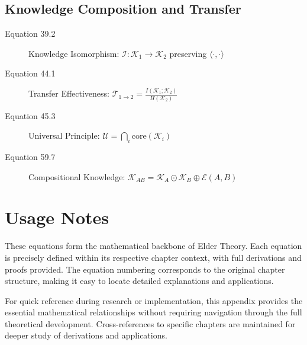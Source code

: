 \subsection{Knowledge Composition and Transfer}

\begin{description}
\item[Equation 39.2] Knowledge Isomorphism: $\mathcal{I}: \mathcal{K}_1 \rightarrow \mathcal{K}_2$ preserving $\langle \cdot, \cdot \rangle$
\item[Equation 44.1] Transfer Effectiveness: $\mathcal{T}_{1 \rightarrow 2} = \frac{I(\mathcal{K}_1; \mathcal{K}_2)}{H(\mathcal{K}_2)}$
\item[Equation 45.3] Universal Principle: $\mathcal{U} = \bigcap_{i} \text{core}(\mathcal{K}_i)$
\item[Equation 59.7] Compositional Knowledge: $\mathcal{K}_{AB} = \mathcal{K}_A \odot \mathcal{K}_B \oplus \mathcal{E}(A,B)$
\end{description}

\section{Usage Notes}

These equations form the mathematical backbone of Elder Theory. Each equation is precisely defined within its respective chapter context, with full derivations and proofs provided. The equation numbering corresponds to the original chapter structure, making it easy to locate detailed explanations and applications.

For quick reference during research or implementation, this appendix provides the essential mathematical relationships without requiring navigation through the full theoretical development. Cross-references to specific chapters are maintained for deeper study of derivations and applications.
